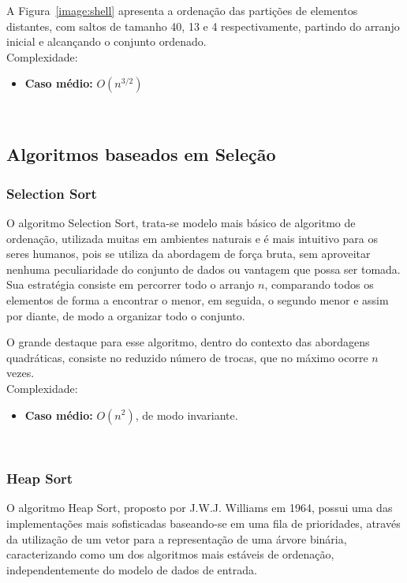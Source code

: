 \documentclass[conference]{IEEEtran}
\begin{document}
A Figura~\ref{image:shell} apresenta a ordenação das partições de elementos distantes, com saltos de tamanho 40, 13 e 4 respectivamente, partindo do arranjo inicial e alcançando o conjunto ordenado.\\

Complexidade:
\begin{itemize}
\item \textbf{Caso médio:} $O (n^{3/2})$
\end{itemize}
~\\
\subsection{Algoritmos baseados em Seleção}


\subsubsection{Selection Sort}
O algoritmo Selection Sort, trata-se modelo mais básico de algoritmo de ordenação, utilizada muitas em ambientes naturais e é mais intuitivo para os seres humanos, pois se utiliza da abordagem de força bruta, sem aproveitar nenhuma peculiaridade do conjunto de dados ou vantagem que possa ser tomada. Sua estratégia consiste em percorrer todo o arranjo $n$, comparando todos os elementos de forma a encontrar o menor, em seguida, o segundo menor e assim por diante, de modo a organizar todo o conjunto.

O grande destaque para esse algoritmo, dentro do contexto das abordagens quadráticas, consiste no reduzido número de trocas, que no máximo ocorre $n$ vezes.\\

Complexidade:
\begin{itemize}
\item \textbf{Caso médio:} $O (n^2)$, de modo invariante.
\end{itemize}

~\\
\subsubsection{Heap Sort}

O algoritmo Heap Sort, proposto por J.W.J. Williams em 1964, possui uma das implementações mais sofisticadas baseando-se em uma fila de prioridades, através da utilização de um vetor para a representação de uma árvore binária, caracterizando como um dos algoritmos mais estáveis de ordenação, independentemente do modelo de dados de entrada. 
\end{document}
